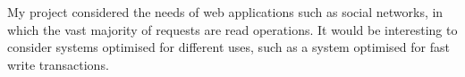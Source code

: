 \documentclass[12pt,a4paper,twoside,openany]{report}
\begin{document}
My project considered the needs of web applications such as social networks, in which the vast majority of requests are read operations. It would be interesting to consider systems optimised for different uses, such as a system optimised for fast write transactions.


%
%
%
\end{document}
